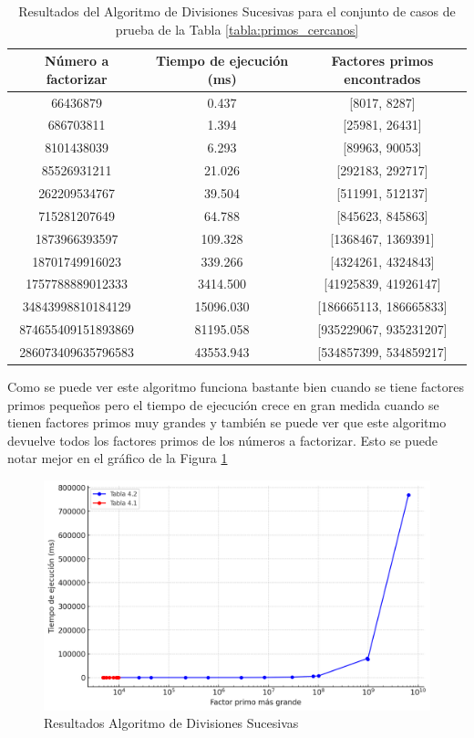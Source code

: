     \begin{table}[H]
        \centering
        \begin{tabular}{ccc}
        \toprule
        Número a factorizar & Tiempo de ejecución (ms) & Factores primos encontrados\\
        \midrule
        66436879 & 0.437 & [8017, 8287]\\
        686703811 & 1.394 & [25981, 26431]\\
        8101438039 & 6.293 & [89963, 90053]\\
        85526931211 & 21.026 & [292183, 292717]\\
        262209534767 & 39.504 & [511991, 512137]\\
        715281207649 & 64.788 & [845623, 845863]\\
        1873966393597 & 109.328 & [1368467, 1369391]\\
        18701749916023 & 339.266 & [4324261, 4324843]\\
        1757788889012333 & 3414.500 & [41925839, 41926147]\\
        34843998810184129 & 15096.030 & [186665113, 186665833]\\
        874655409151893869 & 81195.058 & [935229067, 935231207]\\
        286073409635796583 & 43553.943 & [534857399, 534859217]\\

        \bottomrule
        \end{tabular}
        \caption{Resultados del Algoritmo de Divisiones Sucesivas para el conjunto de casos de prueba de la Tabla \ref{tabla:primos_cercanos}}
        \label{tab:res-trial-cercanos}
    \end{table}

    Como se puede ver este algoritmo funciona bastante bien cuando se tiene factores primos pequeños pero el tiempo de ejecución crece en gran medida cuando se tienen factores primos muy grandes y también se puede ver que este algoritmo devuelve todos los factores primos de los números a factorizar. Esto se puede notar mejor en el gráfico de la Figura \ref{fig:res-trial}
    

    \begin{figure}[H]
        \centering
        \includegraphics[width=\linewidth]{images/trial_divition3.png}
        \caption{Resultados Algoritmo de Divisiones Sucesivas}
        \label{fig:res-trial}
    \end{figure}

